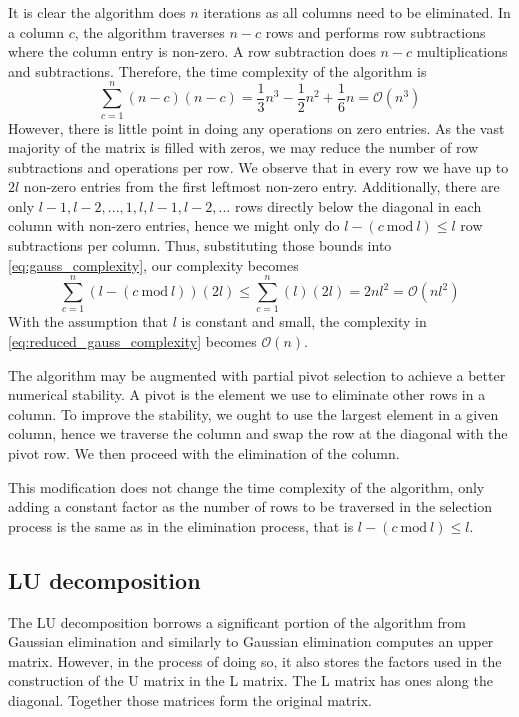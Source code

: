 \documentclass[12pt, a4paper]{article}
\newcommand{\bigO}{\mathcal{O}}
\begin{document}
It is clear the algorithm does $n$ iterations as all columns need to be
eliminated. In a column $c$, the algorithm traverses $n - c$ rows and performs
row subtractions where the column entry is non-zero. A row subtraction does $n -
c$ multiplications and subtractions. Therefore, the time complexity of the
algorithm is
\begin{equation} \label{eq:gauss_complexity}
  \sum_{c = 1}^{n} (n - c)(n - c) = \frac{1}{3}n^3 - \frac{1}{2}n^2 + \frac{1}{6}n = \bigO(n^3)
\end{equation}
However, there is little point in doing any operations on zero entries. As the
vast majority of the matrix is filled with zeros, we may reduce the number of
row subtractions and operations per row. We observe that in every row we have up
to $2l$ non-zero entries from the first leftmost non-zero entry. Additionally,
there are only $l - 1, l - 2, ..., 1, l, l - 1, l - 2, ...$ rows directly below
the diagonal in each column with non-zero entries, hence we might only do $l -
(c \ \textrm{mod} \ l) \le l$ row subtractions per column. Thus, substituting
those bounds into \eqref{eq:gauss_complexity}, our complexity becomes
\begin{equation} \label{eq:reduced_gauss_complexity}
  \sum_{c = 1}^{n} (l - (c \ \textrm{mod} \ l))(2l) \le \sum_{c = 1}^{n} (l)(2l) = 2nl^2 = \bigO(nl^2)
\end{equation}
With the assumption that $l$ is constant and small, the complexity in
\eqref{eq:reduced_gauss_complexity} becomes $\bigO(n)$.

The algorithm may be augmented with partial pivot selection to achieve a better
numerical stability. A pivot is the element we use to eliminate other rows in a
column. To improve the stability, we ought to use the largest element in a given
column, hence we traverse the column and swap the row at the diagonal with the
pivot row. We then proceed with the elimination of the column.

This modification does not change the time complexity of the algorithm, only
adding a constant factor as the number of rows to be traversed in the selection
process is the same as in the elimination process, that is $l - (c \
\textrm{mod} \ l) \le l$.

\subsection{LU decomposition}
The LU decomposition borrows a significant portion of the algorithm from
Gaussian elimination and similarly to Gaussian elimination computes an upper
matrix. However, in the process of doing so, it also stores the factors used in
the construction of the U matrix in the L matrix. The L matrix has ones along
the diagonal. Together those matrices form the original matrix.
\end{document}
